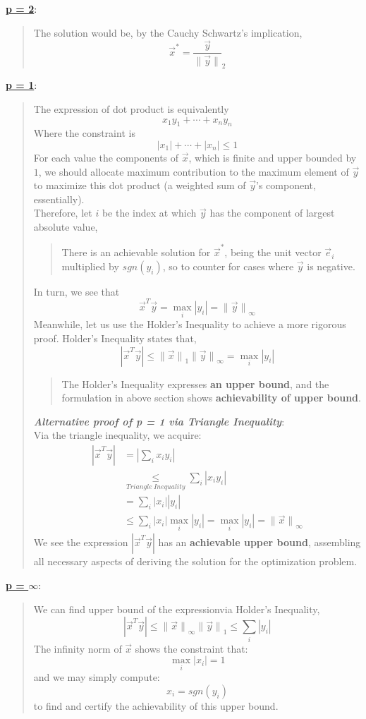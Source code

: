 \underline{\textbf{p = 2}}:
\begin{quote}
    The solution would be, by the Cauchy Schwartz's implication,
    \[\vec{x}^* = \frac{\vec{y}}{\lVert \vec{y} \rVert}_2\]
\end{quote}
\underline{\textbf{p = 1}}:
\begin{quote}
    The expression of dot product is equivalently
    \[x_1 y_1 + \cdots + x_n y_n\]
    Where the constraint is
    \[|x_1| + \cdots + |x_n| \leq 1\]
    For each value the components of $\vec{x}$, which is finite and upper bounded by $1$, we should allocate maximum contribution to the maximum element of $\vec{y}$ to maximize this dot product (a weighted sum of $\vec{y}$'s component, essentially). \\
    Therefore, let $i$ be the index at which $\vec{y}$ has the component of largest absolute value,
    \begin{quote}
        There is an achievable solution for $\vec{x}^*$, being the unit vector $\vec{e}_i$ multiplied by $sgn(y_i)$, so to counter for cases where $\vec{y}$ is negative.
    \end{quote}
    \par
    In turn, we see that
    \[\vec{x}^T \vec{y} = \max_i |y_i| = {\lVert \vec{y} \rVert}_\infty\]
    Meanwhile, let us use the Holder's Inequality to achieve a more rigorous proof. Holder's Inequality states that,
    \[
        |\vec{x}^T \vec{y}| \leq {\lVert \vec{x} \rVert}_1 {\lVert \vec{y} \rVert}_\infty = \max_i |y_i|
    \]
    \begin{quote}
        The Holder's Inequality expresses \textbf{an upper bound}, and the formulation in above section shows \textbf{achievability of upper bound}.
    \end{quote}
    \textbf{\textit{Alternative proof of p = 1 via Triangle Inequality}}: \\
    Via the triangle inequality, we acquire:
    \begin{align*}
        |\vec{x}^T \vec{y}| &= |\sum_i x_i y_i| \\
        &\underset{Triangle\ Inequality}{\leq} \sum_i |x_i y_i| \\
        &= \sum_i |x_i||y_i| \\
        &\leq \sum_i |x_i| \max_i |y_i| = \max_i |y_i| = {\lVert \vec{x} \rVert}_\infty
    \end{align*}
    We see the expression $|\vec{x}^T \vec{y}|$ has an \textbf{achievable upper bound}, assembling all necessary aspects of deriving the solution for the optimization problem.
\end{quote}
\underline{\textbf{p = $\infty$}}:
\begin{quote}
    We can find upper bound of the expressionvia Holder's Inequality,
    \[
        |\vec{x}^T \vec{y}| \leq {\lVert \vec{x} \rVert}_\infty {\lVert \vec{y} \rVert}_1 \leq \sum_i |y_i|
    \]
    The infinity norm of $\vec{x}$ shows the constraint that:
    \[
        \max_i |x_i| = 1
    \]
    and we may simply compute:
    \[
        x_i = sgn(y_i)
    \]
    to find and certify the achievability of this upper bound.
\end{quote}

